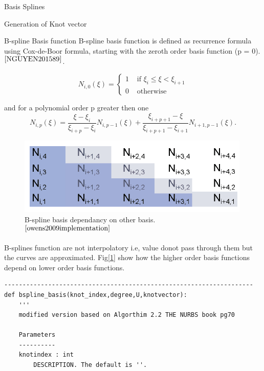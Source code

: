 \documentclass[a4paper,12pt,times]{article}
\begin{document}
\begin{section}{Basis Splines}
\begin{subsection}{Generation of Knot vector}
\end{subsection}
\begin{subsection}{B-spline Basis function}
B-spline basis function is defined as recurrence formula using Cox-de-Boor formula, starting with the zeroth order basis function (p = 0).$^{\cite{NGUYEN201589}}$. 


\begin{equation}\label{Cox-de-Boor formula zero basics}
N_{i, 0}(\xi)=\left\{\begin{array}{ll}
1 & \text { if } \xi_{i} \leq \xi<\xi_{i+1} \\
0 & \text { otherwise }
\end{array}\right.
\end{equation}

and for a polynomial order p greater then one
\begin{equation}\label{Cox-de-Boor formula higher order}
N_{i, p}(\xi)=\frac{\xi-\xi_{i}}{\xi_{i+p}-\xi_{i}} N_{i, p-1}(\xi)+\frac{\xi_{i+p+1}-\xi}{\xi_{i+p+1}-\xi_{i+1}} N_{i+1, p-1}(\xi) .
\end{equation}

\begin{figure}[h!]
\centering
\includegraphics[width=0.75\linewidth]{Bspline_basis_recussive.png}
\caption{B-spline basis dependancy on other basis.$^{\cite{owens2009implementation}}$}
\label{fig:B-spline basis dependancy on other basis}
\end{figure}


B-splines function are not interpolatory i.e, value donot pass through them but the curves are approximated. Fig[\ref{fig:B-spline basis dependancy on other basis}] show how the higher order basis functions depend on lower order basis functions.

 
\begin{verbatim} 
--------------------------------------------------------------------
def bspline_basis(knot_index,degree,U,knotvector):
    '''
    modified version based on Algorthim 2.2 THE NURBS book pg70

    Parameters
    ----------
    knotindex : int 
        DESCRIPTION. The default is ''.


\end{verbatim}
\end{subsection}
\end{section}
\end{document}
